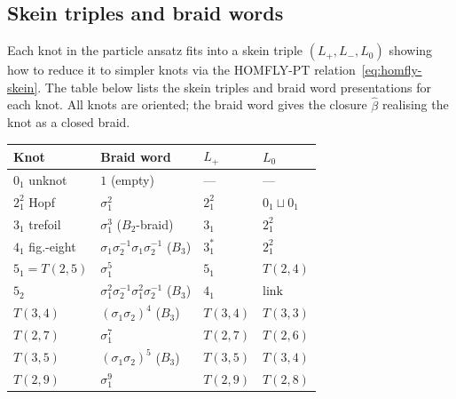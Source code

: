 \subsection{Skein triples and braid words}
\label{subsec:skein-triples}

\begin{remark}
\label{rem:skein-triples}
Each knot in the particle ansatz fits into a skein triple
$(L_+, L_-, L_0)$ showing how to reduce it to simpler knots via the
HOMFLY-PT relation~\eqref{eq:homfly-skein}.  The table below lists the
skein triples and braid word presentations for each knot.  All knots
are oriented; the braid word gives the closure $\hat\beta$ realising the
knot as a closed braid.

\medskip
{\renewcommand{\arraystretch}{1.4}
\noindent\begin{tabular}{llll}
\hline
\textbf{Knot} & \textbf{Braid word} & \textbf{$L_+$} & \textbf{$L_0$} \\
\hline
$0_1$ unknot
  & $1$ (empty)
  & ---
  & --- \\[2pt]
$2^2_1$ Hopf
  & $\sigma_1^2$
  & $2^2_1$
  & $0_1 \sqcup 0_1$ \\[2pt]
$3_1$ trefoil
  & $\sigma_1^3$ ($B_2$-braid)
  & $3_1$
  & $2^2_1$ \\[2pt]
$4_1$ fig.-eight
  & $\sigma_1\sigma_2^{-1}\sigma_1\sigma_2^{-1}$ ($B_3$)
  & $3_1^*$
  & $2^2_1$ \\[2pt]
$5_1 = T(2,5)$
  & $\sigma_1^5$
  & $5_1$
  & $T(2,4)$ \\[2pt]
$5_2$
  & $\sigma_1^2\sigma_2^{-1}\sigma_1^2\sigma_2^{-1}$ ($B_3$)
  & $4_1$
  & $\text{link}$ \\[2pt]
$T(3,4)$
  & $(\sigma_1\sigma_2)^4$ ($B_3$)
  & $T(3,4)$
  & $T(3,3)$ \\[2pt]
$T(2,7)$
  & $\sigma_1^7$
  & $T(2,7)$
  & $T(2,6)$ \\[2pt]
$T(3,5)$
  & $(\sigma_1\sigma_2)^5$ ($B_3$)
  & $T(3,5)$
  & $T(3,4)$ \\[2pt]
$T(2,9)$
  & $\sigma_1^9$
  & $T(2,9)$
  & $T(2,8)$ \\[2pt]
\hline
\end{tabular}}
\end{remark}

